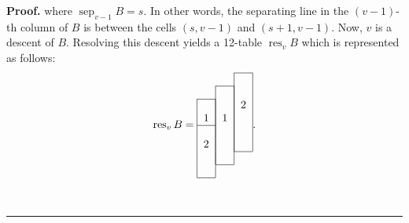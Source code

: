 \documentclass[12pt]{article}
\theoremstyle{plain}
\theoremstyle{definition}
\newenvironment{proof}[1][Proof]{\noindent\textbf{#1.} }{\ \rule{0.5em}{0.5em}}
\begin{document}
\begin{proof}
where $\operatorname*{sep}\nolimits_{v-1}B = s$. In other words, the separating line in the
$\left(v-1\right)$-th column of $B$
is between the cells $\left(s,v-1\right)$ and
$\left(s+1,v-1\right)$.
Now, $v$ is a descent of $B$.
Resolving this descent yields a
12-table $\operatorname{res}_{v}B$ which is represented as follows:
\[
\operatorname*{res}\nolimits_{v}B=%
\begin{tabular}{ccc}
\cline{3-3} & & \multicolumn{1}{|c|}{} \\
\cline{2-2} & \multicolumn{1}{|c|}{} & \multicolumn{1}{|c|}{} \\
\cline{1-1} \multicolumn{1}{|c|}{} & \multicolumn{1}{|c|}{} & \multicolumn
{1}{|c|}{2} \\
\multicolumn{1}{|c|}{1} & \multicolumn{1}{|c|}{1} & \multicolumn{1}{|c|}{} \\
\cline{1-1} \multicolumn{1}{|c|}{} & \multicolumn{1}{|c|}{} & \multicolumn
{1}{|c|}{} \\
\multicolumn{1}{|c|}{2} & \multicolumn{1}{|c|}{} & \multicolumn{1}{|c|}{} \\
\cline{3-3} \multicolumn{1}{|c|}{} & \multicolumn{1}{|c|}{} \\
\cline{2-2} \multicolumn{1}{|c|}{} \\
\cline{1-1}
\end{tabular}%
.
\]

\end{proof}
\end{document}
